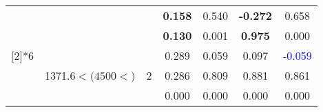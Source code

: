 \begin{table}
\begin{tabular}{ccccccc}
          &       &       & \textbf{0.158 } & 0.540  & \textbf{-0.272 } & 0.658  \\
          &       &       & \textbf{0.130 } & 0.001  & \textbf{0.975 } & 0.000  \bigstrut\\\cline{4-7}\noalign{\smallskip}
    \multirow{3}[2]{*}{6} & \multirow{3}[2]{2.5cm}{1371.6$< (4500<$)} & \multirow{3}[2]{*}{2} & 0.289  & 0.059  & 0.097  & \textcolor{blue}{-0.059}  \\
          &       &       & 0.286  & 0.809  & 0.881  & 0.861  \\
          &       &       & 0.000  & 0.000  & 0.000  & 0.000  \\
    \bottomrule
    \end{tabular}%
  \label{tab:Set3SWJDl}%
\end{table}%
